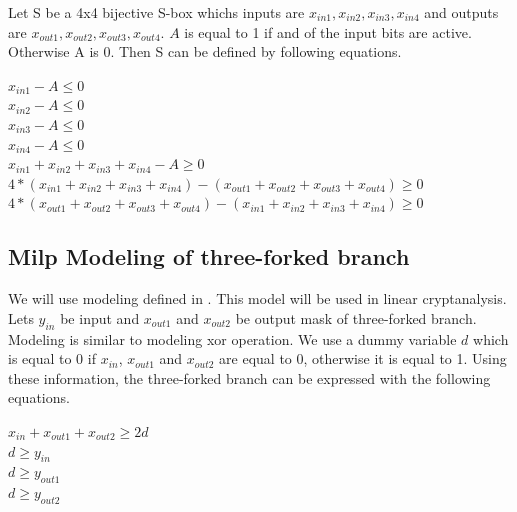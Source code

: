 Let S be a 4x4 bijective S-box whichs inputs are $x_{in1},x_{in2},x_{in3},x_{in4}$ and outputs are $x_{out1},x_{out2},x_{out3},x_{out4}$. $A$ is equal to 1 if and of the input bits are active. Otherwise A is 0. Then S can be defined by following equations.

\begin{center}
    $x_{in1} - A \leq 0$ \\
    $x_{in2} - A \leq 0$ \\
    $x_{in3} - A \leq 0$ \\
    $x_{in4} - A \leq 0$ \\
    $x_{in1} + x_{in2} + x_{in3} + x_{in4} - A \geq 0$ \\
    $4*(x_{in1} + x_{in2} + x_{in3} + x_{in4}) - (x_{out1} + x_{out2} + x_{out3} + x_{out4}) \geq 0$ \\
    $4*(x_{out1} + x_{out2} + x_{out3} + x_{out4}) - (x_{in1} + x_{in2} + x_{in3} + x_{in4}) \geq 0$ \\
\end{center}

\subsection{Milp Modeling of three-forked branch }
We will use modeling defined in \cite{mouha2012differential}. This model will be used in linear cryptanalysis. Lets $y_{in}$ be input and $x_{out1}$ and $x_{out2}$ be output mask of three-forked branch. Modeling is similar to modeling xor operation. We use a dummy variable $d$ which is equal to 0 if $x_{in}$, $x_{out1}$ and $x_{out2}$ are equal to 0, otherwise it is equal to 1. Using these information, the three-forked branch can be expressed with the following equations.

\begin{center}
    $x_{in} + x_{out1} + x_{out2} \geq 2d $ \\
    $d \geq y_{in} $ \\
    $d \geq y_{out1} $ \\
    $d \geq y_{out2} $ 
\end{center}



